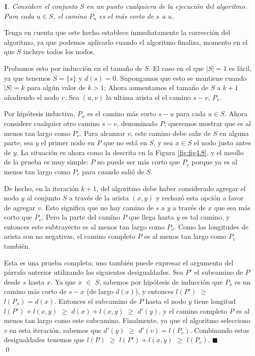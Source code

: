 \documentclass[a4paper, 12pt]{book}
\theoremstyle{dotless}
\newtheorem{theorem}{}[section]
\renewenvironment{proof}{\vspace{12pt}{\noindent\bfseries Demostración.}}{\qed\vspace{12pt}}
\begin{document}
\noindent\colorbox{mygray}{\parbox{\textwidth}{
\begin{theorem}
Considere el conjunto $S$ en un punto cualquiera de la ejecución del algoritmo. Para cada $u \in S$, el camino $P_u$ es el más corto de $s$ a $u$.
\end{theorem}
}}

Tenga en cuenta que este hecho establece inmediatamente la corrección del algoritmo, ya que podemos aplicarlo cuando el algoritmo finaliza, momento en el que $S$ incluye todos los nodos.

\begin{proof}
Probamos esto por inducción en el tamaño de $S$. El caso en el que $|S| = 1$ es fácil, ya que tenemos $S=\{s\}$ y $d(s)=0$. Supongamos que esto se mantiene cuando $|S|=k$ para algún valor de $k > 1$; Ahora aumentamos el tamaño de $S$ a $k+1$ añadiendo el nodo $v$.
Sea $(u,v)$ la ultima arista el el camino $s-v$, $P_v$.

Por hipótesis inductiva, $P_u$ es el camino más corto $s-u$ para cada $u\in S$. Ahora considere cualquier otro camino $s-v$, denominado $P$; queremos mostrar que es al menos tan largo como $P_v$. Para alcanzar $v$, este camino debe salir de $S$ en alguna parte; sea $y$ el primer nodo en $P$ que no está en $S$, y sea $x \in S$ el nodo justo antes de $y$.
La situación es ahora como la descrita en la Figura \ref{fig:fig4.8}, y el meollo de la prueba es muy simple: $P$ no puede ser más corto que $P_v$ porque ya es al menos tan largo como $P_v$ para cuando salió de $S$. 

De hecho, en la iteración $k + 1$, del algoritmo debe haber considerado agregar el nodo $y$ al conjunto $S$ a través de la arista $(x, y)$ y rechazó esta opción a favor de agregar $v$. Esto significa que no hay camino de $s$ a $y$ a través de $x$ que sea más corto que $P_v$. 
Pero la parte del camino $P$ que llega hasta $y$ es tal camino, y entonces este subtrayecto es al menos tan largo como $P_v$. Como las longitudes de arista
son no negativas, el camino completo $P$ es al menos tan largo como $P_v$ también.

Esta es una prueba completa; uno también puede expresar el argumento del párrafo anterior utilizando las siguientes desigualdades. Sea $P'$ el subcamino de $P$ desde $s$ hasta $x$. Ya que $x$ \(\in\) $S$, sabemos por hipótesis de inducción que $P_x$ es un camino más corto de $s-x$ (de largo $d(x)$), y entonces $l(P')$ \(\geq\) $l(P_x)=d(x)$. Entonces el subcamino de $P$ hasta el nodo $y$ tiene longitud $l(P')+l(x,y)$ \(\geq\) $d(x)+l(x,y)$ \(\geq\) $d'(y)$, y el camino completo $P$ es al menos tan largo como este subcamino. Finalmente, ya que el algoritmo selecciono $v$ en esta iteración, sabemos que $d'(y)$ \(\geq\) $d'(v)=l(P_v)$. Combinando estas desigualdades tenemos que $l(P)$ \(\geq\) $l(P') + l(x,y)$ \(\geq\) $l(P_v)$. \(\blacksquare\)\\

\end{proof}
\end{document}
